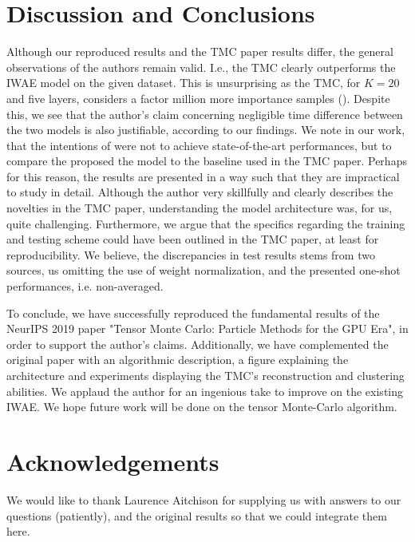 \section{Discussion and Conclusions}
Although our reproduced results and the TMC paper results differ,
the general observations of the authors remain valid. I.e., the TMC clearly outperforms the IWAE model on the given dataset. This is unsurprising as the TMC, for $K=20$ and five layers, considers a factor million more importance samples (\cite{tmc}). Despite this, we see that the author's claim concerning negligible time difference between the two models is also justifiable, according to our findings. We note in our work, that the intentions of \cite{tmc} were not to achieve state-of-the-art performances, but to compare the proposed the model to the baseline used in the TMC paper. Perhaps for this reason, the results are presented in a way such that they are impractical to study in detail. Although the author very skillfully and clearly describes the novelties in the TMC paper, understanding the model architecture was, for us, quite challenging. Furthermore, we argue that the specifics regarding the training and testing scheme could have been outlined in the TMC paper, at least for reproducibility.
We believe, the discrepancies in test results stems from two sources, us omitting the use of weight normalization, and the presented one-shot performances, i.e. non-averaged. 

To conclude, we have successfully reproduced the fundamental results of the NeurIPS 2019 paper "Tensor Monte Carlo: Particle Methods for the GPU Era", in order to support the author's claims. Additionally, we have complemented the original paper with an algorithmic description, a figure explaining the architecture and experiments displaying the TMC's reconstruction and clustering abilities. We applaud the author for an ingenious take to improve on the existing IWAE. We hope future work will be done on the tensor Monte-Carlo algorithm. 

\section{Acknowledgements}
We would like to thank Laurence Aitchison for supplying us with answers to our questions (patiently), and the original results so that we could integrate them here. 

%  
% 